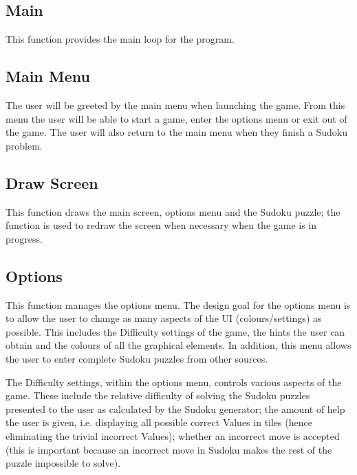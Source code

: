 \documentclass[fleqn]{article}
\begin{document}
 


\subsection{Main}
This function provides the main loop for the program. 

\subsection{Main Menu}
The user will be greeted by the main menu when launching the game. From this menu the user will be able to start a game, enter the options menu or exit out of the game. The user will also return to the main menu when they finish a Sudoku problem.

\subsection{Draw Screen}
This function draws the main screen, options menu and the Sudoku puzzle; the function is used to redraw the screen when necessary when the game is in progress.
 
\subsection{Options}
This function manages the options menu. The design goal for the options menu is to allow the user to change as many aspects of the UI (colours/settings) as possible. This includes the Difficulty settings of the game, the hints the user can obtain and the colours of all the graphical elements. In addition, this menu allows the user to enter complete Sudoku puzzles from other sources.
 
The Difficulty settings, within the options menu, controls various aspects of the game. These include the relative difficulty of solving the Sudoku puzzles presented to the user as calculated by the Sudoku generator; the amount of help the user is given, i.e. displaying all possible correct Values in tiles (hence eliminating the trivial incorrect Values); whether an incorrect move is accepted (this is important because an incorrect move in Sudoku makes the rest of the puzzle impossible to solve).
\end{document}
